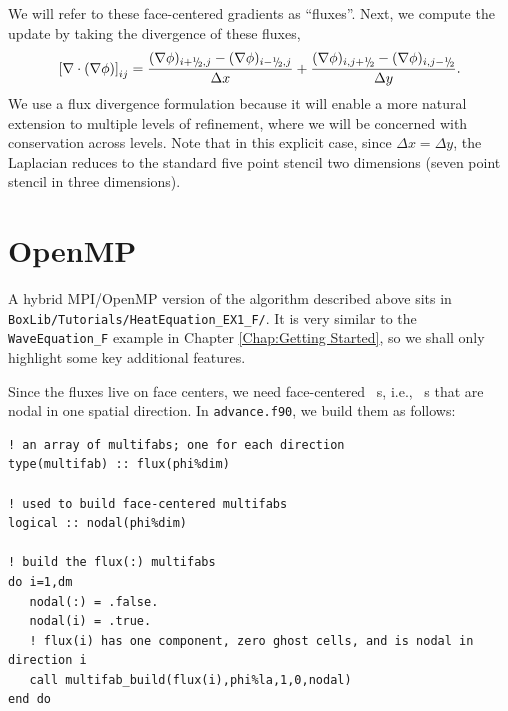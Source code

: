 We will refer to these face-centered gradients as ``fluxes''.
Next, we compute the update by taking the divergence of these fluxes,
\begin{equation}
\left[\nabla\cdot(\nabla\phi)\right]_{ij} = \frac{(\nabla\phi)_{i+\myhalf,j}-(\nabla\phi)_{i-\myhalf,j}}{\Delta x} + \frac{(\nabla\phi)_{i,j+\myhalf}-(\nabla\phi)_{i,j-\myhalf}}{\Delta y}.
\end{equation}
We use a flux divergence formulation because it will enable a more natural 
extension to multiple levels of refinement, where we will be concerned with
conservation across levels.  Note that in this explicit case, since $\Delta x = \Delta y$, 
the Laplacian reduces to the standard five point stencil two dimensions
(seven point stencil in three dimensions).  

\section{OpenMP}\label{Sec:OpenMP}

A hybrid MPI/OpenMP version of the algorithm described above sits in 
{\tt BoxLib/Tutorials/HeatEquation\_EX1\_F/}.  It is very similar to the
{\tt WaveEquation\_F} example in Chapter \ref{Chap:Getting Started}, so we shall
only highlight some key additional features.

Since the fluxes live on face centers, we need face-centered \MultiFab\ s, i.e.,
\MultiFab\ s that are nodal in one spatial direction.  In {\tt advance.f90},
we build them as follows:
\begin{lstlisting}[backgroundcolor=\color{light-green}]
! an array of multifabs; one for each direction
type(multifab) :: flux(phi%dim) 

! used to build face-centered multifabs
logical :: nodal(phi%dim) 

! build the flux(:) multifabs
do i=1,dm
   nodal(:) = .false.
   nodal(i) = .true.
   ! flux(i) has one component, zero ghost cells, and is nodal in direction i
   call multifab_build(flux(i),phi%la,1,0,nodal)
end do
\end{lstlisting}

